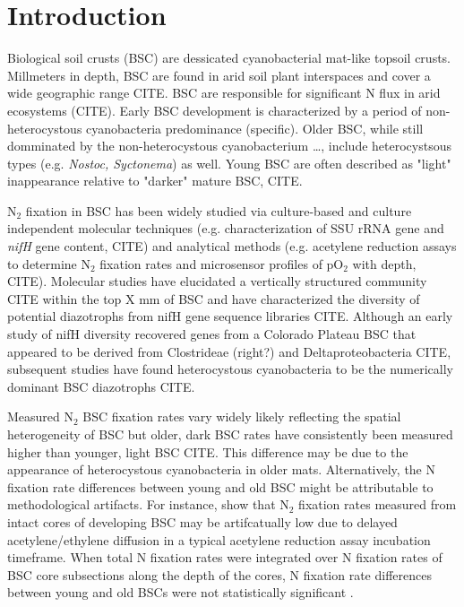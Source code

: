 \section{Introduction}


Biological soil crusts (BSC) are dessicated cyanobacterial mat-like topsoil crusts. Millmeters in depth, BSC are found in arid soil plant interspaces and cover a wide geographic range CITE. BSC are responsible for significant N flux in arid ecosystems (CITE). Early BSC development is characterized by a period of non-heterocystous cyanobacteria predominance (specific). Older BSC, while still domminated by the non-heterocystous cyanobacterium \dots, include heterocystsous types (e.g. \textit{Nostoc, Syctonema}) as well. Young BSC are often described as "light" inappearance relative to "darker" mature BSC, CITE.

N$_{2}$ fixation in BSC has been widely studied via culture-based and culture independent molecular techniques (e.g. characterization of SSU rRNA gene and \textit{nifH} gene content, CITE) and analytical methods (e.g. acetylene reduction assays to determine N$_{2}$ fixation rates and microsensor profiles of pO$_{2}$ with depth, CITE). Molecular studies have elucidated a vertically structured community CITE within the top X mm of BSC and have characterized the diversity of potential diazotrophs from nifH gene sequence libraries CITE. Although an early study of nifH diversity recovered genes from a Colorado Plateau BSC that appeared to be derived from Clostrideae (right?) and Deltaproteobacteria CITE, subsequent studies have found heterocystous cyanobacteria to be the numerically dominant BSC diazotrophs CITE. 

Measured N$_{2}$ BSC fixation rates vary widely likely reflecting the spatial heterogeneity of BSC but older, dark BSC rates have consistently been measured higher than younger, light BSC CITE. This difference may be due to the appearance of heterocystous cyanobacteria in older mats. Alternatively, the N fixation rate differences between young and old BSC might be attributable to methodological artifacts. For instance, \citet{15643930} show that N$_{2}$ fixation rates measured from intact cores of developing BSC may be artifcatually low due to delayed acetylene/ethylene diffusion in a typical acetylene reduction assay incubation timeframe. When total N fixation rates were integrated over N fixation rates of BSC core subsections along the depth of the cores, N fixation rate differences between young and old BSCs were not statistically significant \cite{15643930}.

